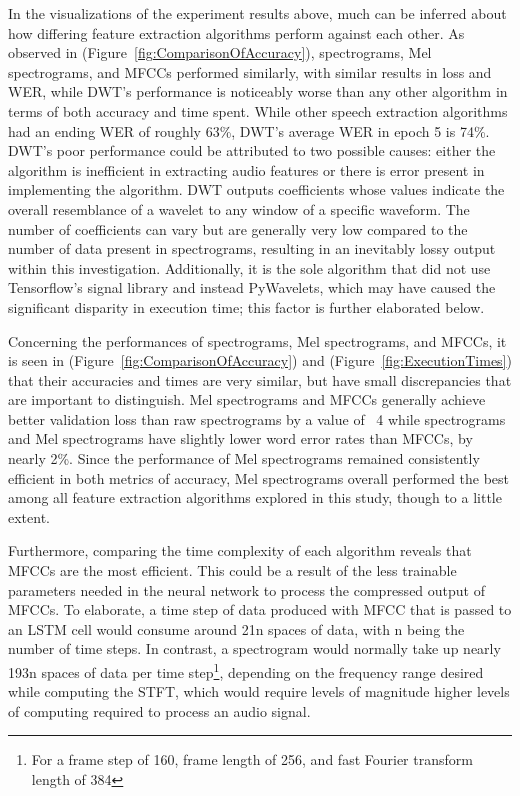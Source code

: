 In the visualizations of the experiment results above, much can be inferred about how differing feature extraction algorithms perform against each other. As observed in (Figure~\ref{fig:ComparisonOfAccuracy}), spectrograms, Mel spectrograms, and MFCCs performed similarly, with similar results in loss and WER, while DWT’s performance is noticeably worse than any other algorithm in terms of both accuracy and time spent. While other speech extraction algorithms had an ending WER of roughly 63\%, DWT’s average WER in epoch 5 is 74\%. DWT’s poor performance could be attributed to two possible causes: either the algorithm is inefficient in extracting audio features or there is error present in implementing the algorithm. DWT outputs coefficients whose values indicate the overall resemblance of a wavelet to any window of a specific waveform. The number of coefficients can vary but are generally very low compared to the number of data present in spectrograms, resulting in an inevitably lossy output within this investigation. Additionally, it is the sole algorithm that did not use Tensorflow’s signal library and instead PyWavelets, which may have caused the significant disparity in execution time; this factor is further elaborated below.
\par
Concerning the performances of spectrograms, Mel spectrograms, and MFCCs, it is seen in (Figure~\ref{fig:ComparisonOfAccuracy}) and (Figure~\ref{fig:ExecutionTimes}) that their accuracies and times are very similar, but have small discrepancies that are important to distinguish. Mel spectrograms and MFCCs generally achieve better validation loss than raw spectrograms by a value of ~4 while spectrograms and Mel spectrograms have slightly lower word error rates than MFCCs, by nearly 2\%. Since the performance of Mel spectrograms remained consistently efficient in both metrics of accuracy, Mel spectrograms overall performed the best among all feature extraction algorithms explored in this study, though to a little extent.
\par
Furthermore, comparing the time complexity of each algorithm reveals that MFCCs are the most efficient. This could be a result of the less trainable parameters needed in the neural network to process the compressed output of MFCCs. To elaborate, a time step of data produced with MFCC that is passed to an LSTM cell would consume around 21n spaces of data, with n being the number of time steps. In contrast, a spectrogram would normally take up nearly 193n spaces of data per time step\footnote{For a frame step of 160, frame length of 256, and fast Fourier transform length of 384}, depending on the frequency range desired while computing the STFT, which would require levels of magnitude higher levels of computing required to process an audio signal.

